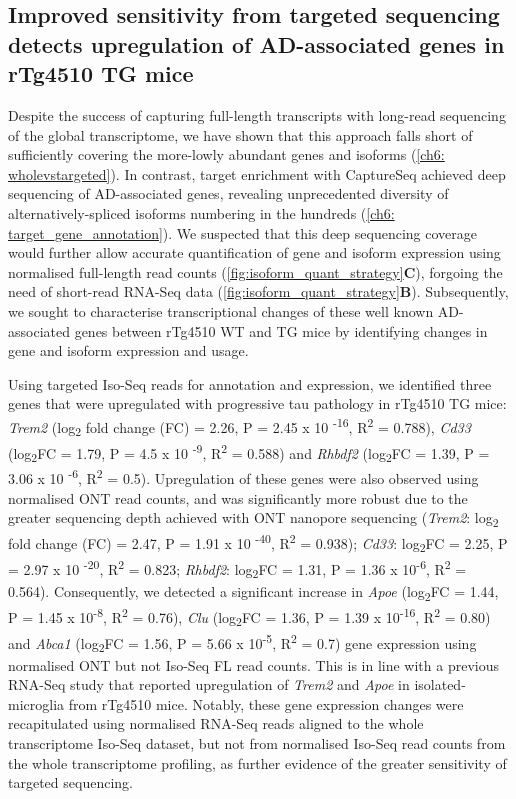 \subsection{Improved sensitivity from targeted sequencing detects upregulation of AD-associated genes in rTg4510 TG mice}
Despite the success of capturing full-length transcripts with long-read sequencing of the global transcriptome, we have shown that this approach falls short of sufficiently covering the more-lowly abundant genes and isoforms (\cref{ch6: wholevstargeted}). In contrast, target enrichment with CaptureSeq achieved deep sequencing of AD-associated genes, revealing unprecedented diversity of alternatively-spliced isoforms numbering in the hundreds (\cref{ch6: target_gene_annotation}). We suspected that this deep sequencing coverage would further allow accurate quantification of gene and isoform expression using normalised full-length read counts (\cref{fig:isoform_quant_strategy}\textbf{C}), forgoing the need of short-read RNA-Seq data (\cref{fig:isoform_quant_strategy}\textbf{B}). Subsequently, we sought to characterise transcriptional changes of these well known AD-associated genes between rTg4510 WT and TG mice by identifying changes in gene and isoform expression and usage.

Using targeted Iso-Seq reads for annotation and expression, we identified three genes that were upregulated with progressive tau pathology in rTg4510 TG mice: \textit{Trem2} (log\textsubscript{2} fold change (FC) = 2.26, P = 2.45 x 10 \textsuperscript{-16}, R\textsuperscript{2} = 0.788), \textit{Cd33} (log\textsubscript{2}FC = 1.79, P = 4.5 x 10 \textsuperscript{-9}, R\textsuperscript{2} = 0.588) and \textit{Rhbdf2} (log\textsubscript{2}FC = 1.39, P = 3.06 x 10 \textsuperscript{-6}, R\textsuperscript{2} = 0.5). Upregulation of these genes were also observed using normalised ONT read counts, and was significantly more robust due to the greater sequencing depth achieved with ONT nanopore sequencing (\textit{Trem2}: log\textsubscript{2} fold change (FC) = 2.47, P = 1.91 x 10 \textsuperscript{-40}, R\textsuperscript{2} = 0.938); \textit{Cd33}: log\textsubscript{2}FC = 2.25, P = 2.97 x 10 \textsuperscript{-20}, R\textsuperscript{2} = 0.823; \textit{Rhbdf2}: log\textsubscript{2}FC = 1.31, P = 1.36 x 10\textsuperscript{-6}, R\textsuperscript{2} = 0.564). Consequently, we detected a significant increase in \textit{Apoe} (log\textsubscript{2}FC = 1.44, P = 1.45 x 10\textsuperscript{-8},  R\textsuperscript{2} = 0.76), \textit{Clu} (log\textsubscript{2}FC = 1.36, P = 1.39 x 10\textsuperscript{-16}, R\textsuperscript{2} = 0.80) and \textit{Abca1} (log\textsubscript{2}FC = 1.56, P = 5.66 x 10\textsuperscript{-5}, R\textsuperscript{2} = 0.7) gene expression using normalised ONT but not Iso-Seq FL read counts. This is in line with a previous RNA-Seq study that reported upregulation of \textit{Trem2} and \textit{Apoe} in isolated-microglia from rTg4510 mice\cite{Sobue2021}. Notably, these gene expression changes were recapitulated using normalised RNA-Seq reads aligned to the whole transcriptome Iso-Seq dataset, but not from normalised Iso-Seq read counts from the whole transcriptome profiling, as further evidence of the greater sensitivity of targeted sequencing. 

